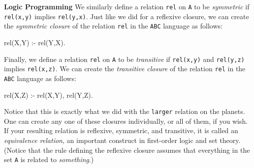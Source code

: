 \begin{minipage}[t]{\sw}
\slidenumber
\LARGE
{\bf Logic Programming}\exx
We similarly define a relation \verb'rel' on \verb'A' to be {\em symmetric}
if \verb'rel(x,y)' implies \verb'rel(y,x)'.
Just like we did for a reflexive closure,
we can create the {\em symmetric closure} of the relation \verb'rel'
in the \verb'ABC' language as follows:
{\Large
\begin{qv}
rel(X,Y) :- rel(Y,X).
\end{qv}
}
Finally, we define a relation \verb'rel' on \verb'A' to be {\em transitive}
if \verb'rel(x,y)' and \verb'rel(y,z)' implies \verb'rel(x,z)'.
We can create the {\em transitive closure} of the relation \verb'rel'
in the \verb'ABC' language as follows:
{\Large
\begin{qv}
rel(X,Z) :- rel(X,Y), rel(Y,Z).
\end{qv}
}
Notice that this is exactly what we did
with the \verb'larger' relation on the planets.\exx
One can create any one of these closures individually,
or all of them, if you wish.
If your resulting relation is reflexive, symmetric, and transitive,
it is called an {\em equivalence relation},
an important construct in first-order logic and set theory.\exx
(Notice that the rule defining the reflexive closure assumes
that everything in the set \verb'A' is related to {\em something}.)
\end{minipage}
